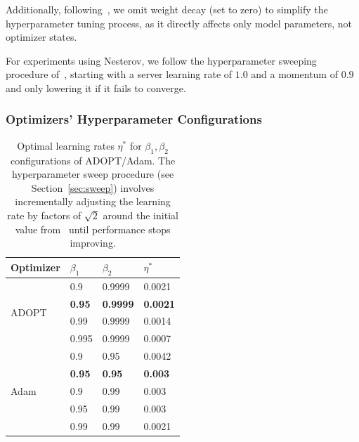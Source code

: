 Additionally, following~\citet{zhang2025critical}, we omit weight decay (set to zero) to simplify the hyperparameter tuning process, as it directly affects only model parameters, not optimizer states.

For experiments using Nesterov, we follow the hyperparameter sweeping procedure of~\citet{charles2025communication}, starting with a server learning rate of $1.0$ and a momentum of $0.9$ and only lowering it if it fails to converge.

\subsubsection{Optimizers' Hyperparameter Configurations}
\label{sec:hp_configs}

\begin{table}[h]
\centering
\caption{Optimal learning rates $\eta^*$ for $\beta_1, \beta_2$ configurations of ADOPT/Adam. The hyperparameter sweep procedure (see Section~\ref{sec:sweep}) involves incrementally adjusting the learning rate by factors of $\sqrt{2}$ around the initial value from~\citet{allal2025smollm2} until performance stops improving.}
\label{tab:lr_sweep}
\begin{tabular}{llll}
\toprule
Optimizer & $\beta_1$ & $\beta_2$ & $\eta^*$ \\
\midrule
\multirow{4}{*}{ADOPT} & 0.9   & 0.9999 & 0.0021 \\
                        & \textbf{0.95}  & \textbf{0.9999} & \textbf{0.0021} \\
                        & 0.99  & 0.9999 & 0.0014 \\
                        & 0.995 & 0.9999 & 0.0007 \\
\midrule
\multirow{5}{*}{Adam}  & 0.9   & 0.95   & 0.0042 \\
                        & \textbf{0.95}  & \textbf{0.95}   & \textbf{0.003}  \\
                        & 0.9   & 0.99   & 0.003  \\
                        & 0.95  & 0.99   & 0.003  \\
                        & 0.99  & 0.99   & 0.0021 \\
\bottomrule
\end{tabular}
\end{table}

